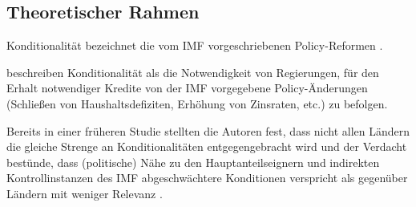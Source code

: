 
\subsection{Theoretischer Rahmen}

Konditionalität bezeichnet die vom IMF vorgeschriebenen Policy-Reformen \parencite[545]{KentikelenisIMFConditionalityDevelopment2016}.

\textcite{DreherPoliticsIMFConditionality2015} beschreiben Konditionalität als die Notwendigkeit von Regierungen, für den Erhalt notwendiger Kredite von der IMF vorgegebene Policy-Änderungen (Schließen von Haushaltsdefiziten, Erhöhung von Zinsraten, etc.) zu befolgen.


Bereits in einer früheren Studie stellten die Autoren fest, dass nicht allen Ländern die gleiche Strenge an Konditionalitäten entgegengebracht wird und der Verdacht bestünde, dass (politische) Nähe zu den Hauptanteilseignern und indirekten Kontrollinstanzen des IMF abgeschwächtere Konditionen verspricht als gegenüber Ländern mit weniger Relevanz \parencite{DesaiGlobalGovernanceMultipolar2011}.


